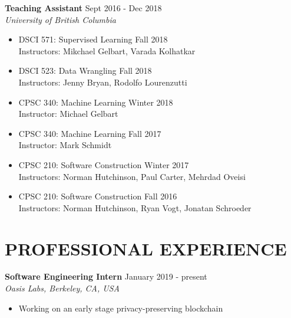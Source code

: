 \documentclass[10pt]{res} %
\begin{document}
\textbf{Teaching Assistant} \hfill Sept 2016 - Dec 2018 \\
{\sl University of British Columbia } \\
\begin{itemize}    
    \item DSCI 571: Supervised Learning \hfill Fall 2018 \\
    Instructors: Mikchael Gelbart, Varada Kolhatkar
    \item DSCI 523: Data Wrangling \hfill Fall 2018 \\
    Instructors: Jenny Bryan, Rodolfo Lourenzutti
    \item CPSC 340: Machine Learning \hfill Winter 2018 \\
    Instructor: Michael Gelbart
    \item CPSC 340: Machine Learning \hfill Fall 2017 \\
    Instructor: Mark Schmidt
    \item CPSC 210: Software Construction \hfill Winter 2017 \\
    Instructors: Norman Hutchinson, Paul Carter, Mehrdad Oveisi
    \item CPSC 210: Software Construction \hfill Fall 2016 \\
    Instructors: Norman Hutchinson, Ryan Vogt, Jonatan Schroeder
\end{itemize}


\section{PROFESSIONAL EXPERIENCE} 

\vspace{0.2in} %

\textbf{Software Engineering Intern} \hfill January 2019 - present \\
{\sl Oasis Labs, Berkeley, CA, USA }
\begin{itemize}  %
    \item Working on an early stage privacy-preserving blockchain
\end{itemize}
\end{document}
